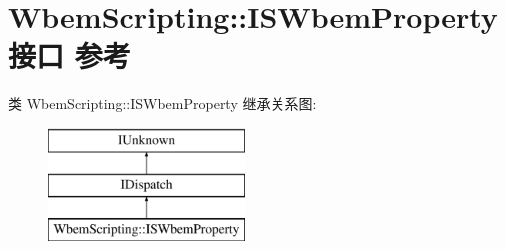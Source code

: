 \hypertarget{interface_wbem_scripting_1_1_i_s_wbem_property}{}\section{Wbem\+Scripting\+:\+:I\+S\+Wbem\+Property接口 参考}
\label{interface_wbem_scripting_1_1_i_s_wbem_property}
类 Wbem\+Scripting\+:\+:I\+S\+Wbem\+Property 继承关系图\+:\begin{figure}[H]
\begin{center}
\leavevmode
\includegraphics[height=3.000000cm]{interface_wbem_scripting_1_1_i_s_wbem_property}
\end{center}
\end{figure}
